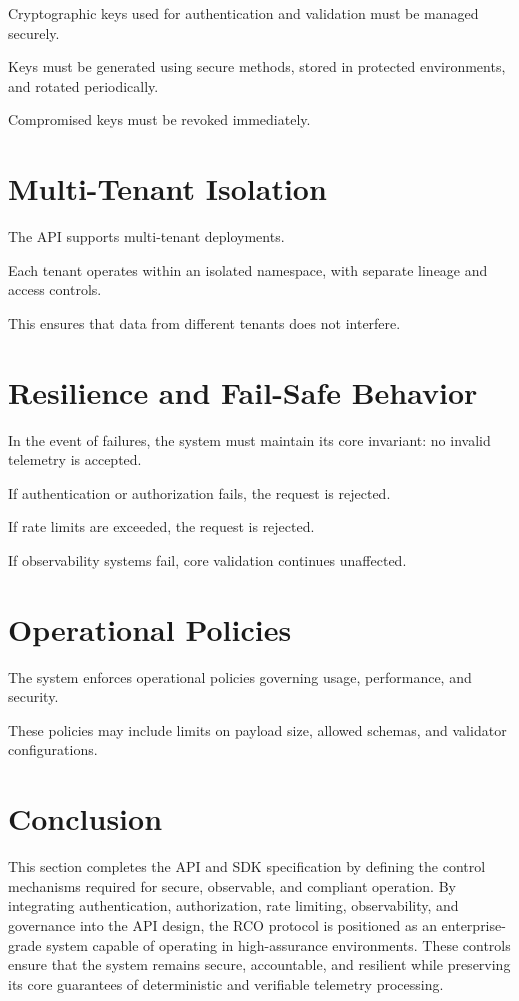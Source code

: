 Cryptographic keys used for authentication and validation must be managed securely.

Keys must be generated using secure methods, stored in protected environments, and rotated periodically.

Compromised keys must be revoked immediately.

\section{Multi-Tenant Isolation}

The API supports multi-tenant deployments.

Each tenant operates within an isolated namespace, with separate lineage and access controls.

This ensures that data from different tenants does not interfere.

\section{Resilience and Fail-Safe Behavior}

In the event of failures, the system must maintain its core invariant: no invalid telemetry is accepted.

If authentication or authorization fails, the request is rejected.

If rate limits are exceeded, the request is rejected.

If observability systems fail, core validation continues unaffected.

\section{Operational Policies}

The system enforces operational policies governing usage, performance, and security.

These policies may include limits on payload size, allowed schemas, and validator configurations.

\section{Conclusion}

This section completes the API and SDK specification by defining the control mechanisms required for secure, observable, and compliant operation. By integrating authentication, authorization, rate limiting, observability, and governance into the API design, the RCO protocol is positioned as an enterprise-grade system capable of operating in high-assurance environments. These controls ensure that the system remains secure, accountable, and resilient while preserving its core guarantees of deterministic and verifiable telemetry processing.